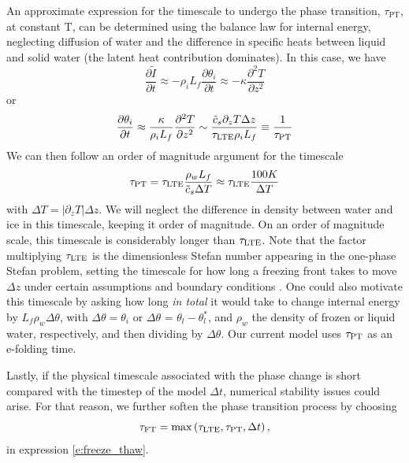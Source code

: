 \documentclass[twoside,10pt]{report}
\begin{document}
An approximate expression for the timescale to undergo the phase transition, $\tau_{\mathrm{PT}}$, at constant T, can be determined using the balance law for internal energy, neglecting diffusion of water and the difference in specific heats between liquid and solid water (the latent heat contribution dominates). In this case, we have 
\begin{equation}\label{e:idot_during_pt}
    \frac{\partial \tilde{I}}{\partial t} \approx -\rho_i L_f \frac{\partial \theta_i}{\partial t} \approx -\kappa \frac{\partial^2 T}{\partial z^2}
\end{equation}
or 
\begin{equation}\label{e:idot_during_pt2}
    \frac{\partial \theta_i}{\partial t} \approx \frac{\kappa}{\rho_i L_f} \frac{\partial^2 T}{\partial z^2} \sim \frac{\tilde{c}_s \partial_z T \Delta z}{\tau_{\rm LTE} \rho_i L_f} \equiv \frac{1}{\tau_{\rm PT}}
\end{equation}
We can then follow an order of magnitude argument for the timescale
\begin{equation}
    \tau_{\rm PT} = \tau_{\rm LTE} \frac{\rho_w L_f }{\tilde{c}_s \Delta T} \approx \tau_{\rm LTE} \frac{100 K}{\Delta T}
\end{equation}
with $\Delta T = |\partial_z T| \Delta z$. We will neglect the difference in density between water and ice in this timescale, keeping it order of magnitude. On an order of magnitude scale, this timescale is considerably longer than $\tau_{\rm LTE}$. Note that the factor multiplying $\tau_{\rm LTE}$ is the dimensionless Stefan number appearing in the one-phase Stefan problem, setting the timescale for how long a freezing front takes to move $\Delta z$ under certain assumptions and boundary conditions \cite{Alexiadesbook}. One could also motivate this timescale by asking how long \emph{in total} it would take to change internal energy by $L_f\rho_w\Delta \theta$, with $\Delta \theta = \theta_i$ or $\Delta \theta$ = $\theta_l - \theta_l^*$, and $\rho_w$ the density of frozen or liquid water, respectively, and then dividing by $\Delta \theta$. Our current model uses $\tau_{\rm PT}$ as an e-folding time.

Lastly, if the physical timescale associated with the phase change is short compared with the timestep of the model $\Delta t$, numerical stability issues could arise. For that reason, we further soften the phase transition process by choosing
\begin{equation}
    \tau_{\mathrm{FT}} = \max\left(\tau_{\mathrm{LTE}},\tau_{\rm PT}, \Delta t \right),
\end{equation}
in expression \eqref{e:freeze_thaw}. 
\end{document}
